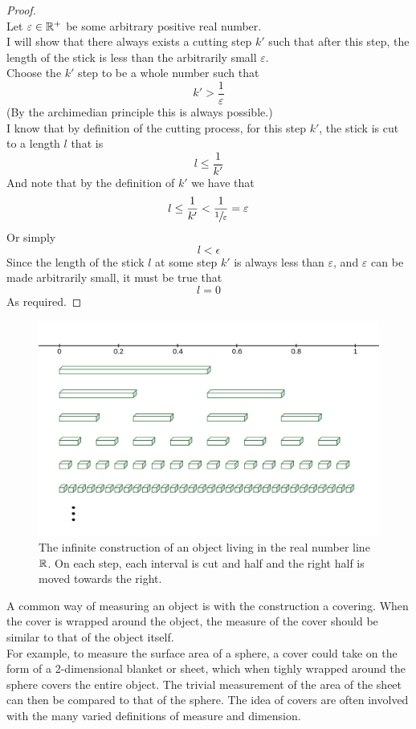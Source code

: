 \documentclass[11pt]{ekblite}
\begin{document}
\begin{example}
\begin{proof}
		\\[0.2in]Let $\varepsilon \in \mathbb{R}^+$ be some arbitrary positive real number.
		\\[0.2in]I will show that there always exists a cutting step $k'$ such that after this step, the length of the stick is less than the arbitrarily small $\varepsilon$. 
		\\[0.2in]Choose the $k'$ step to be a whole number such that
		\[k' > \frac{1}{\varepsilon}\]
		(By the archimedian principle this is always possible.)
		\\[0.2in]I know that by definition of the cutting process, for this step $k'$, the stick is cut to a length $l$ that is
		\[l \le \frac{1}{k'}\] 
		And note that by the definition of $k'$ we have that
		\[l \le \frac{1}{k'} < \frac{1}{\sfrac{1}{\varepsilon}} = \varepsilon\]
		Or simply
		\[l < \epsilon\]
		Since the length of the stick $l$ at some step $k'$ is always less than $\varepsilon$, and $\varepsilon$ can be made arbitrarily small, it must be true that 
		\[l = 0\] 
		As required.
	\end{proof}
\end{example}
\newpage
\begin{figure}[h]
	\includegraphics[scale=0.25]{img/c6.jpg}
	\caption{The infinite construction of an object living in the real number line $\mathbb{R}$. On each step, each interval is cut and half and the right half is moved towards the right.}
\end{figure}
A common way of measuring an object is with the construction a covering. When the cover is wrapped around the object, the measure of the cover should be similar to that of the object itself.
\\[0.2in]For example, to measure the surface area of a sphere, a cover could take on the form of a 2-dimensional blanket or sheet, which when tighly wrapped around the sphere covers the entire object. The trivial measurement of the area of the sheet can then be compared to that of the sphere. The idea of covers are often involved with the many varied definitions of measure and dimension.
\end{document}
